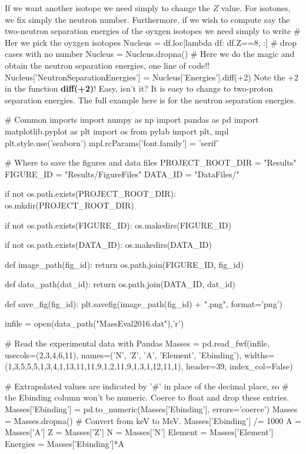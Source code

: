 \documentclass[%
oneside,                 %
final,                   %
10pt]{article}
\newenvironment{doconceexercise}{}{}
\begin{document}
\begin{doconceexercise}
If we want another isotope we need simply to change the $Z$ value. For isotones, we fix simply the neutron number. Furthermore, if we wish to compute say the two-neutron separation energies of the oyxgen isotopes we need simply to write 
\bpycod
# Her we pick the oyxgen isotopes
Nucleus = df.loc[lambda df: df.Z==8, :]
# drop cases with no number
Nucleus = Nucleus.dropna()
# Here we do the magic and obtain the neutron separation energies, one line of code!!
Nucleus['NeutronSeparationEnergies'] = Nucleus['Energies'].diff(+2)
\epycod
Note the $+2$ in the function \textbf{diff(+2)}!  Easy, isn't it? It is easy to change to two-proton separation energies. The full example here is for the neutron separation energies.

\bpycod
# Common imports
import numpy as np
import pandas as pd
import matplotlib.pyplot as plt
import os
from pylab import plt, mpl
plt.style.use('seaborn')
mpl.rcParams['font.family'] = 'serif'


# Where to save the figures and data files
PROJECT_ROOT_DIR = "Results"
FIGURE_ID = "Results/FigureFiles"
DATA_ID = "DataFiles/"

if not os.path.exists(PROJECT_ROOT_DIR):
    os.mkdir(PROJECT_ROOT_DIR)

if not os.path.exists(FIGURE_ID):
    os.makedirs(FIGURE_ID)

if not os.path.exists(DATA_ID):
    os.makedirs(DATA_ID)

def image_path(fig_id):
    return os.path.join(FIGURE_ID, fig_id)

def data_path(dat_id):
    return os.path.join(DATA_ID, dat_id)

def save_fig(fig_id):
    plt.savefig(image_path(fig_id) + ".png", format='png')

infile = open(data_path("MassEval2016.dat"),'r')


# Read the experimental data with Pandas
Masses = pd.read_fwf(infile, usecols=(2,3,4,6,11),
              names=('N', 'Z', 'A', 'Element', 'Ebinding'),
              widths=(1,3,5,5,5,1,3,4,1,13,11,11,9,1,2,11,9,1,3,1,12,11,1),
              header=39,
              index_col=False)

# Extrapolated values are indicated by '#' in place of the decimal place, so
# the Ebinding column won't be numeric. Coerce to float and drop these entries.
Masses['Ebinding'] = pd.to_numeric(Masses['Ebinding'], errors='coerce')
Masses = Masses.dropna()
# Convert from keV to MeV.
Masses['Ebinding'] /= 1000
A = Masses['A']
Z = Masses['Z']
N = Masses['N']
Element = Masses['Element']
Energies = Masses['Ebinding']*A


\end{doconceexercise}
\end{document}
